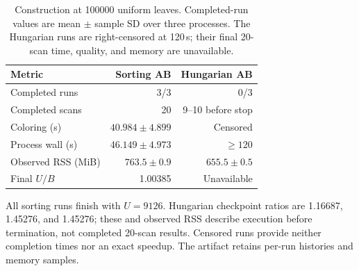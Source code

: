 \begin{table}[t]
\centering\small\setlength{\tabcolsep}{3pt}
\caption{Construction at 100000 uniform leaves. Completed-run values are mean $\pm$ sample SD over three processes. The Hungarian runs are right-censored at 120\,s; their final 20-scan time, quality, and memory are unavailable.}
\label{tab:construction-scale}
\begin{tabular}{@{}lrr@{}}
\toprule
Metric & Sorting AB & Hungarian AB\\
\midrule
Completed runs & 3/3 & 0/3\\
Completed scans & 20 & 9--10 before stop\\
Coloring (s) & $40.984\pm4.899$ & Censored\\
Process wall (s) & $46.149\pm4.973$ & $\ge120$\\
Observed RSS (MiB) & $763.5\pm0.9$ & $655.5\pm0.5$\\
Final $U/B$ & 1.00385 & Unavailable\\
\bottomrule
\end{tabular}
\end{table}

All sorting runs finish with $U=9126$. Hungarian checkpoint ratios are 1.16687, 1.45276, and 1.45276; these and observed RSS describe execution before termination, not completed 20-scan results. Censored runs provide neither completion times nor an exact speedup. The artifact retains per-run histories and memory samples.
